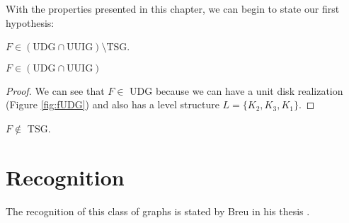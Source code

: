 With the properties presented in this chapter, we can begin to state our first hypothesis:

\begin{hyp}
  $F \in (\text{UDG}\cap\text{UUIG}) \setminus \text{TSG}$.
\end{hyp}

\begin{claim}
 $F \in (\text{UDG}\cap\text{UUIG})$
\end{claim}

\begin{proof}
  We can see that $F \in$ UDG because we can have a unit disk realization (Figure \ref{fig:fUDG}) and also has a level structure $L = \{K_2, K_3, K_1\}$.
\end{proof}

\begin{theorem}
$F \notin$ TSG.
\end{theorem}



\section{Recognition}

The recognition of this class of graphs is stated by Breu in his thesis .
